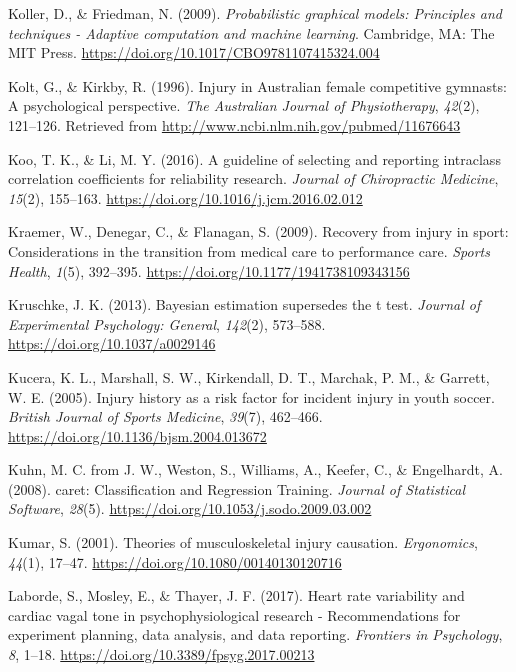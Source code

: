 \documentclass[man,floatsintext]{apa6}
\begin{document}
\leavevmode\hypertarget{ref-Koller2009}{}%
Koller, D., \& Friedman, N. (2009). \emph{Probabilistic graphical models: Principles and techniques - Adaptive computation and machine learning}. Cambridge, MA: The MIT Press. \url{https://doi.org/10.1017/CBO9781107415324.004}

\leavevmode\hypertarget{ref-Kolt1996}{}%
Kolt, G., \& Kirkby, R. (1996). Injury in Australian female competitive gymnasts: A psychological perspective. \emph{The Australian Journal of Physiotherapy}, \emph{42}(2), 121--126. Retrieved from \url{http://www.ncbi.nlm.nih.gov/pubmed/11676643}

\leavevmode\hypertarget{ref-Koo2016}{}%
Koo, T. K., \& Li, M. Y. (2016). A guideline of selecting and reporting intraclass correlation coefficients for reliability research. \emph{Journal of Chiropractic Medicine}, \emph{15}(2), 155--163. \url{https://doi.org/10.1016/j.jcm.2016.02.012}

\leavevmode\hypertarget{ref-Kraemer2009}{}%
Kraemer, W., Denegar, C., \& Flanagan, S. (2009). Recovery from injury in sport: Considerations in the transition from medical care to performance care. \emph{Sports Health}, \emph{1}(5), 392--395. \url{https://doi.org/10.1177/1941738109343156}

\leavevmode\hypertarget{ref-Kruschke2013}{}%
Kruschke, J. K. (2013). Bayesian estimation supersedes the t test. \emph{Journal of Experimental Psychology: General}, \emph{142}(2), 573--588. \url{https://doi.org/10.1037/a0029146}

\leavevmode\hypertarget{ref-Kucera2005}{}%
Kucera, K. L., Marshall, S. W., Kirkendall, D. T., Marchak, P. M., \& Garrett, W. E. (2005). Injury history as a risk factor for incident injury in youth soccer. \emph{British Journal of Sports Medicine}, \emph{39}(7), 462--466. \url{https://doi.org/10.1136/bjsm.2004.013672}

\leavevmode\hypertarget{ref-Kuhn2008}{}%
Kuhn, M. C. from J. W., Weston, S., Williams, A., Keefer, C., \& Engelhardt, A. (2008). caret: Classification and Regression Training. \emph{Journal of Statistical Software}, \emph{28}(5). \url{https://doi.org/10.1053/j.sodo.2009.03.002}

\leavevmode\hypertarget{ref-Kumar2001}{}%
Kumar, S. (2001). Theories of musculoskeletal injury causation. \emph{Ergonomics}, \emph{44}(1), 17--47. \url{https://doi.org/10.1080/00140130120716}

\leavevmode\hypertarget{ref-Laborde2017}{}%
Laborde, S., Mosley, E., \& Thayer, J. F. (2017). Heart rate variability and cardiac vagal tone in psychophysiological research - Recommendations for experiment planning, data analysis, and data reporting. \emph{Frontiers in Psychology}, \emph{8}, 1--18. \url{https://doi.org/10.3389/fpsyg.2017.00213}
\end{document}

